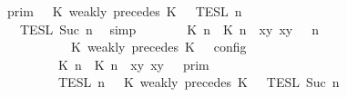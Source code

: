 \begin{isabellebody}
\ \ \ \ \ \ \ \ {\isacharequal}\ {\isasymlbrakk}{\isasymlbrakk}\ {\isasymGamma}\ {\isasymrbrakk}{\isasymrbrakk}\isactrlsub p\isactrlsub r\isactrlsub i\isactrlsub m\ {\isasyminter}\ {\isasymlbrakk}{\isasymlbrakk}\ {\isacharparenleft}K\ weakly\ precedes\ K\ {\isacharhash}\ {\isasymPsi}\ {\isasymrbrakk}{\isasymrbrakk}\isactrlsub T\isactrlsub E\isactrlsub S\isactrlsub L\isactrlbsup {\isasymge}\ n\isactrlesup \isanewline
\ \ \ \ \ \ \ \ \ \ {\isasyminter}\ {\isasymlbrakk}{\isasymlbrakk}\ {\isasymPhi}\ {\isasymrbrakk}{\isasymrbrakk}\isactrlsub T\isactrlsub E\isactrlsub S\isactrlsub L\isactrlbsup {\isasymge}\ Suc\ n\isactrlesup {\isacartoucheclose}\ \isamarkupfalse%
\ simp\isanewline
\ \ \isamarkupfalse%
\ \isamarkupfalse%
\ {\isacartoucheopen}{\isasymlbrakk}\ {\isacharparenleft}{\isacharparenleft}{\isasymlceil}{\isacharhash}\isactrlsup {\isasymle}\ K\ n{\isacharcomma}\ {\isacharhash}\isactrlsup {\isasymle}\ K\ n{\isasymrceil}\ {\isasymin}\ {\isacharparenleft}{\isasymlambda}{\isacharparenleft}x{\isacharcomma}y{\isacharparenright}{\isachardot}\ x{\isasymle}y{\isacharparenright}{\isacharparenright}\ {\isacharhash}\ {\isasymGamma}{\isacharparenright}{\isacharcomma}\ n\isanewline
\ \ \ \ \ \ \ \ \ \ \ \ \ \ \ \ \ \ {\isasymturnstile}\ {\isasymPsi}\ {\isasymtriangleright}\ {\isacharparenleft}{\isacharparenleft}K\ weakly\ precedes\ K\ {\isacharhash}\ {\isasymPhi}{\isacharparenright}\ {\isasymrbrakk}\isactrlsub c\isactrlsub o\isactrlsub n\isactrlsub f\isactrlsub i\isactrlsub g\isanewline
\ \ \ \ \ \ \ \ \ \ \ \ \ \ \ \ {\isacharequal}\ {\isasymlbrakk}{\isasymlbrakk}\ {\isacharparenleft}{\isasymlceil}{\isacharhash}\isactrlsup {\isasymle}\ K\ n{\isacharcomma}\ {\isacharhash}\isactrlsup {\isasymle}\ K\ n{\isasymrceil}\ {\isasymin}\ {\isacharparenleft}{\isasymlambda}{\isacharparenleft}x{\isacharcomma}y{\isacharparenright}{\isachardot}\ x{\isasymle}y{\isacharparenright}{\isacharparenright}\ {\isacharhash}\ {\isasymGamma}\ {\isasymrbrakk}{\isasymrbrakk}\isactrlsub p\isactrlsub r\isactrlsub i\isactrlsub m\isanewline
\ \ \ \ \ \ \ \ \ \ \ \ \ \ \ \ {\isasyminter}\ {\isasymlbrakk}{\isasymlbrakk}\ {\isasymPsi}\ {\isasymrbrakk}{\isasymrbrakk}\isactrlsub T\isactrlsub E\isactrlsub S\isactrlsub L\isactrlbsup {\isasymge}\ n\isactrlesup \ {\isasyminter}\ {\isasymlbrakk}{\isasymlbrakk}\ {\isacharparenleft}K\ weakly\ precedes\ K\ {\isacharhash}\ {\isasymPhi}\ {\isasymrbrakk}{\isasymrbrakk}\isactrlsub T\isactrlsub E\isactrlsub S\isactrlsub L\isactrlbsup {\isasymge}\ Suc\ n\isactrlesup {\isacartoucheclose}\isanewline

\end{isabellebody}
